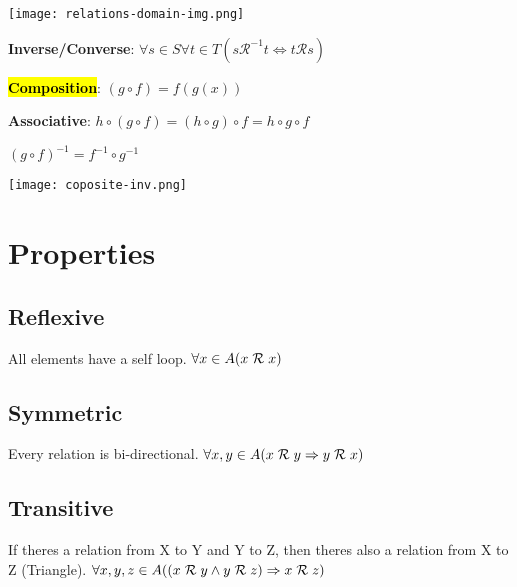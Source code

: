 \documentclass[12pt]{article}
\begin{document}
\begin{spacing}{1.5}
\begin{itemize*}
		\begin{center}
			\texttt{[image: relations-domain-img.png]}
		\end{center}
	
	\item \textbf{Inverse/Converse}: $\forall s \in S \forall t \in T (s \mathcal{R}^{-1} t \Leftrightarrow t \mathcal{R} s)$
	\item \hl{\textbf{Composition}}: $(g \circ f) = f(g(x))$
		\begin{itemize*}
			\item \textbf{Associative}: $h \circ (g \circ f) = (h \circ g) \circ f = h \circ g \circ f$
			\item $(g \circ f)^{-1} = f^{-1} \circ g^{-1}$
		\end{itemize*}
	
		\begin{center}
			\texttt{[image: coposite-inv.png]}
		\end{center}
\end{itemize*}

\section{Properties}

\subsection{Reflexive}

All elements have a self loop. $\forall x \in A (x \hspace{1mm} \mathcal{R} \hspace{1mm} x)$

\subsection{Symmetric}

Every relation is bi-directional. $\forall x, y \in A (x \hspace{1mm} \mathcal{R} \hspace{1mm} y \Rightarrow y \hspace{1mm} \mathcal{R} \hspace{1mm} x)$

\subsection{Transitive}

If theres a relation from X to Y and Y to Z, then theres also a relation from X to Z (Triangle). $\forall x, y, z \in A((x \hspace{1mm} \mathcal{R} \hspace{1mm} y \wedge y \hspace{1mm} \mathcal{R} \hspace{1mm} z) \Rightarrow x \hspace{1mm} \mathcal{R} \hspace{1mm} z)$


\end{spacing}
\end{document}
